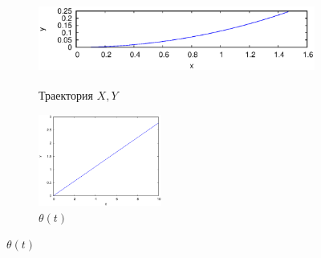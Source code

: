 \begin{figure}
    \centering
    \begin{subfigure}[t]{0.3\textwidth}
        \centering
        \includegraphics[width=\linewidth, height=30mm]{pic/_sol__1_0_1__0__10__1e2_trajectory}
        \caption{Траектория $X, Y$}
        \label{fig:_sol__1_0_1__0__10__1e2_trajectory}
    \end{subfigure}
    \begin{subfigure}[t]{0.3\textwidth}
        \centering
        \includegraphics[width=\linewidth, height=30mm]{pic/_sol__1_0_1__0__10__1e2_theta}
        \caption{$\theta(t)$}
        \label{fig:_sol__1_0_1__0__10__1e2_theta}
    \end{subfigure}
    \vspace{12pt}
    

\end{figure}
